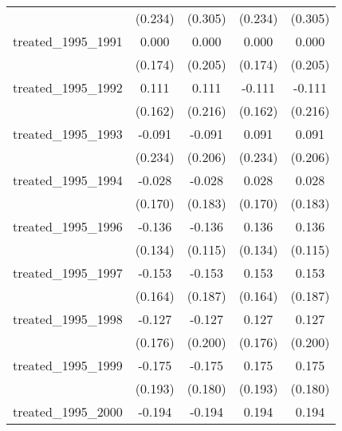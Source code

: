 {\begin{tabular}{l*{4}{c}}
            &     (0.234)         &     (0.305)         &     (0.234)         &     (0.305)         \\
[1em]
treated\_1995\_1991&       0.000         &       0.000         &       0.000         &       0.000         \\
            &     (0.174)         &     (0.205)         &     (0.174)         &     (0.205)         \\
[1em]
treated\_1995\_1992&       0.111         &       0.111         &      -0.111         &      -0.111         \\
            &     (0.162)         &     (0.216)         &     (0.162)         &     (0.216)         \\
[1em]
treated\_1995\_1993&      -0.091         &      -0.091         &       0.091         &       0.091         \\
            &     (0.234)         &     (0.206)         &     (0.234)         &     (0.206)         \\
[1em]
treated\_1995\_1994&      -0.028         &      -0.028         &       0.028         &       0.028         \\
            &     (0.170)         &     (0.183)         &     (0.170)         &     (0.183)         \\
[1em]
treated\_1995\_1996&      -0.136         &      -0.136         &       0.136         &       0.136         \\
            &     (0.134)         &     (0.115)         &     (0.134)         &     (0.115)         \\
[1em]
treated\_1995\_1997&      -0.153         &      -0.153         &       0.153         &       0.153         \\
            &     (0.164)         &     (0.187)         &     (0.164)         &     (0.187)         \\
[1em]
treated\_1995\_1998&      -0.127         &      -0.127         &       0.127         &       0.127         \\
            &     (0.176)         &     (0.200)         &     (0.176)         &     (0.200)         \\
[1em]
treated\_1995\_1999&      -0.175         &      -0.175         &       0.175         &       0.175         \\
            &     (0.193)         &     (0.180)         &     (0.193)         &     (0.180)         \\
[1em]
treated\_1995\_2000&      -0.194         &      -0.194         &       0.194         &       0.194         \\

\end{tabular}}
